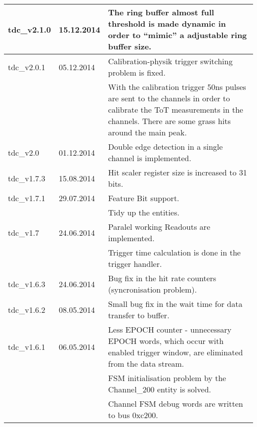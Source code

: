 \documentclass[11pt]{article}
\begin{document}
\begin{center}
\begin{longtable}{|l|l|p{10cm}|}
\hline
 tdc\_v2.1.0       &             15.12.2014  &  The ring buffer almost full threshold is made dynamic in order to ``mimic'' a adjustable ring buffer size.  \\
\hline
 tdc\_v2.0.1       &             05.12.2014  &  Calibration-physik trigger switching problem is fixed.                            \\
                   &                         &  With the calibration trigger 50ns pulses are sent to the channels in order to calibrate the ToT measurements in the channels. There are some grass hits around the main peak.  \\
\hline
 tdc\_v2.0         &             01.12.2014  &  Double edge detection in a single channel is implemented.                         \\
\hline
 tdc\_v1.7.3       &             15.08.2014  &  Hit scaler register size is increased to 31 bits.                                 \\
\hline
 tdc\_v1.7.1       &             29.07.2014  &  Feature Bit support.                                                              \\
                   &                         &  Tidy up the entities.                                                             \\
\hline
 tdc\_v1.7         &             24.06.2014  &  Paralel working Readouts are implemented.                                         \\
                   &                         &  Trigger time calculation is done in the trigger handler.                          \\
\hline
 tdc\_v1.6.3       &             24.06.2014  &  Bug fix in the hit rate counters                         (syncronisation problem).  \\
\hline
 tdc\_v1.6.2       &             08.05.2014  &  Small bug fix in the wait time for data                          transfer to buffer.  \\
\hline
 tdc\_v1.6.1       &             06.05.2014  &  Less EPOCH counter - unnecessary EPOCH words, which occur with enabled trigger window, are eliminated from the data stream.  \\
                   &                         &  FSM initialisation problem by the Channel\_200 entity is solved.                  \\
                   &                         &  Channel FSM debug words are written to bus 0xc200.                                \\

\end{longtable}
\end{center}
\end{document}
